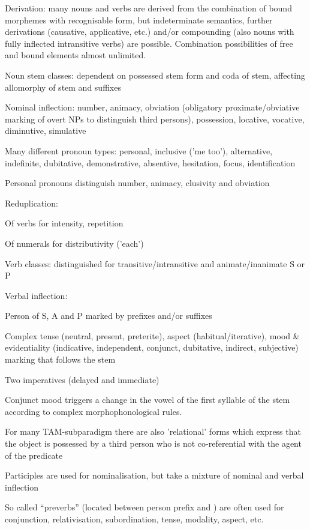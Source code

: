 \documentclass[a4paper, 11pt]{book}
\begin{document}
\begin{itemize*}
\item  Derivation: many nouns and verbs are derived from the combination of bound morphemes with recognisable form, but indeterminate semantics, further derivations (causative, applicative, etc.) and/or compounding (also nouns with fully inflected intransitive verbs) are possible. Combination possibilities of free and bound elements almost unlimited.
\item  Noun stem classes: dependent on possessed stem form and coda of stem, affecting allomorphy of stem and suffixes
\item  Nominal inflection: number, animacy, obviation (obligatory proximate/obviative marking of overt NPs to distinguish third persons), possession, locative, vocative, diminutive, simulative
\item  Many different pronoun types: personal, inclusive ('me too'), alternative, indefinite, dubitative, demonstrative, absentive, hesitation, focus, identification
\item  Personal pronouns distinguish number, animacy, clusivity and obviation
\item  Reduplication:
     \begin{itemize*}
	\item Of verbs for intensity, repetition
	\item Of numerals for distributivity ('each')
     \end{itemize*}
\item  Verb classes: distinguished for transitive/intransitive and animate/inanimate S or P
\item  Verbal inflection:
        \begin{itemize*}
	\item  Person of S, A and P marked by prefixes and/or suffixes
	\item  Complex tense (neutral, present, preterite), aspect (habitual/iterative), mood \& evidentiality (indicative, independent, conjunct, dubitative, indirect, subjective) marking that follows the stem
	\item  Two imperatives (delayed and immediate)
	\item  Conjunct mood triggers a change in the vowel of the first syllable of the stem according 	to complex morphophonological rules.
	\item  For many TAM-subparadigm there are also 'relational' forms which express that the object is possessed by a third person who is not co-referential with the agent of the predicate
        \end{itemize*}
\item  Participles are used for nominalisation, but take a mixture of nominal and verbal inflection
\item  So called “preverbs” (located between person prefix and ) are often used for conjunction, relativisation, subordination, tense, modality, aspect, etc.
\end{itemize*}
\end{document}
